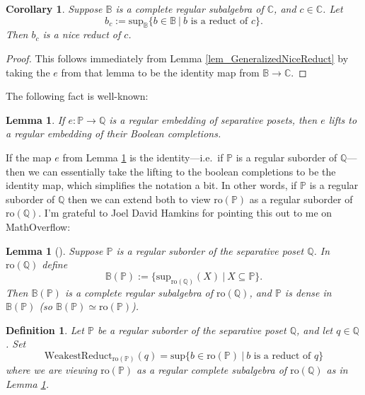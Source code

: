 \documentclass{amsart}
\newtheorem{corollary}[theorem]{Corollary}
\newtheorem{definition}[theorem]{Definition}
\newtheorem{lemma}[theorem]{Lemma}
\begin{document}
\begin{corollary}\label{cor_b_c_is_nicereduct}
Suppose $\mathbb{B}$ is a complete regular subalgebra of $\mathbb{C}$, and $c \in \mathbb{C}$.  Let 
\begin{equation*}
b_c:= \text{sup}_{\mathbb{B}} \{  b \in \mathbb{B} \ | \ b \text{ is a reduct of } c \}.
\end{equation*}
Then $b_c$ is a nice reduct of $c$.
\end{corollary}
\begin{proof}
This follows immediately from Lemma \ref{lem_GeneralizedNiceReduct} by taking the $e$ from that lemma to be the identity map from $\mathbb{B} \to \mathbb{C}$. 
\end{proof}

The following fact is well-known:
\begin{lemma}\label{lem_LiftRegular}
If $e: \mathbb{P} \to \mathbb{Q}$ is a regular embedding of separative posets, then $e$ lifts to a regular embedding of their Boolean completions.
\end{lemma}

If the map $e$ from Lemma \ref{lem_LiftRegular} is the identity---i.e.\ if $\mathbb{P}$ is a regular suborder of $\mathbb{Q}$---then we can essentially take the lifting to the boolean completions to be the identity map, which simplifies the notation a bit.  In other words, if $\mathbb{P}$ is a regular suborder of $\mathbb{Q}$ then we can extend both to view $\text{ro}(\mathbb{P})$ as a regular suborder of $\text{ro}(\mathbb{Q})$.  I'm grateful to Joel David Hamkins for pointing this out to me on MathOverflow:
\begin{lemma}[\cite{206871}]\label{lem_HamkinsLemma}
Suppose $\mathbb{P}$ is a regular suborder of the separative poset $\mathbb{Q}$.  In $\text{ro}(\mathbb{Q})$ define
\begin{equation*}
\mathbb{B}(\mathbb{P}):= \big\{ \text{sup}_{\text{ro}(\mathbb{Q})}(X) \ | \ X \subseteq \mathbb{P}  \big\}.
\end{equation*}
Then $\mathbb{B}(\mathbb{P})$ is a complete regular subalgebra of $\text{ro}(\mathbb{Q})$, and $\mathbb{P}$ is dense in $\mathbb{B}(\mathbb{P})$ (so $\mathbb{B}(\mathbb{P}) \simeq \text{ro}(\mathbb{P})$). 
\end{lemma}

\begin{definition}\label{def_WeakestReduct}
Let $\mathbb{P}$ be a regular suborder of the separative poset $\mathbb{Q}$, and let $q \in \mathbb{Q}$.  Set 
 \begin{equation*}
 \text{WeakestReduct}_{\text{ro}(\mathbb{P})}(q) = \text{sup} \{ b \in \text{ro}(\mathbb{P}) \ | \ b \text{ is a reduct of } q   \}
 \end{equation*}
where we are viewing $\text{ro}(\mathbb{P})$ as a regular complete subalgebra of $\text{ro}(\mathbb{Q})$ as in Lemma \ref{lem_HamkinsLemma}.
\end{definition}
\end{document}
